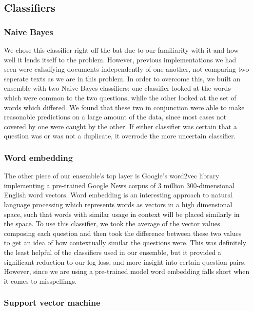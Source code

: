 \documentclass{article}
\begin{document}
\subsection{Classifiers}

\subsubsection{Naive Bayes}

We chose this classifier right off the bat due to our familiarity with it and
how well it lends itself to the problem. However, previous implementations we
had seen were calssifying documents independently of one another, not comparing
two seperate texts as we are in this problem. In order to overcome this, we
built an ensemble with two Naive Bayes classifiers: one classifier looked at the
words which were common to the two questions, while the other looked at the set
of words which differed. We found that these two in conjunction were able to
make reasonable predictions on a large amount of the data, since most cases not
covered by one were caught by the other. If either classifier was certain that a
question was or was not a duplicate, it overrode the more uncertain classifier.

\subsubsection{Word embedding}

The other piece of our ensemble's top layer is Google's word2vec library
implementing a pre-trained Google News corpus of 3 million 300-dimensional
English word vectors. Word embedding is an interesting approach to natural
language processing which represents words as vectors in a high dimensional
space, such that words with similar usage in context will be placed similarly in 
the space. To use this classifier, we took the average of the vector values
composing each question and then took the difference between these two values to
get an idea of how contextually similar the questions were. This was definitely
the least helpful of the classifiers used in our ensemble, but it provided a
significant reduction to our log-loss, and more insight into certain question
pairs. However, since we are using a pre-trained model word embedding falls
short when it comes to misspellings.

\subsubsection{Support vector machine}
\end{document}
